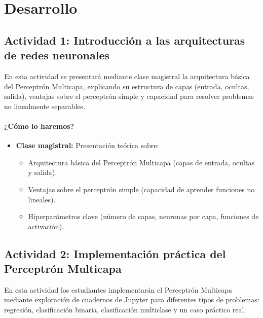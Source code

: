 \documentclass[a4,11pt]{aleph-notas}
\begin{document}
\section*{Desarrollo}

\subsection*{Actividad 1: Introducción a las arquitecturas de redes neuronales}

En esta actividad se presentará mediante clase magistral la arquitectura básica del Perceptrón Multicapa, explicando su estructura de capas (entrada, ocultas, salida), ventajas sobre el perceptrón simple y capacidad para resolver problemas no linealmente separables.

\paragraph{¿Cómo lo haremos?}  
\begin{itemize}[leftmargin=*]
    \item \textbf{Clase magistral:} 
    Presentación teórica sobre:
    \begin{itemize}
        \item Arquitectura básica del Perceptrón Multicapa (capas de entrada, ocultas y salida).
        \item Ventajas sobre el perceptrón simple (capacidad de aprender funciones no lineales).
        \item Hiperparámetros clave (número de capas, neuronas por capa, funciones de activación).
    \end{itemize}
    
\end{itemize}

\subsection*{Actividad 2: Implementación práctica del Perceptrón Multicapa}

En esta actividad los estudiantes implementarán el Perceptrón Multicapa mediante exploración de cuadernos de Jupyter para diferentes tipos de problemas: regresión, clasificación binaria, clasificación multiclase y un caso práctico real.
\end{document}
